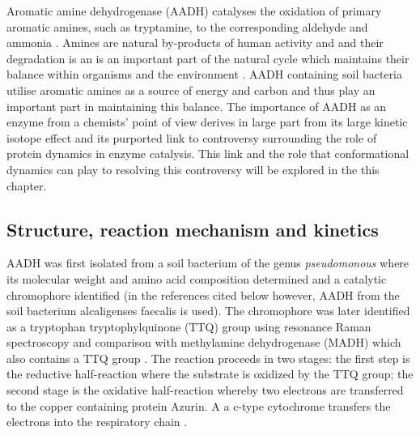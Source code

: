 Aromatic amine dehydrogenase (AADH) catalyses the oxidation of primary aromatic amines, such as tryptamine, to the corresponding aldehyde and ammonia \cite{masgrauAtomicDescriptionEnzyme2006}. Amines are natural by-products of human activity and and their degradation is an is an important part of the natural cycle which maintains their balance within organisms and the environment \cite{chistoserdovCloningSequencingMutagenesis2001}. AADH containing soil bacteria utilise aromatic amines as a source of energy and carbon \cite{govindarajAromaticAmineDehydrogenase1994a} and thus play an important part in maintaining this balance. The importance of AADH as an enzyme from a chemists' point of view derives in large part from its large kinetic isotope effect and its purported link to controversy surrounding the role of protein dynamics in enzyme catalysis. This link and the role that conformational dynamics can play to resolving this controversy will be explored in the this chapter. 


\subsection{Structure, reaction mechanism and kinetics} 


AADH was first isolated from a soil bacterium of the genus \emph{pseudomonous}  where its molecular weight and amino acid composition determined and a catalytic chromophore identified \cite{iwakiCrystallizationPropertiesAromatic1983} (in the references cited below however, AADH from the soil bacterium alcaligenses faecalis is used).  The chromophore was later identified as a tryptophan tryptophylquinone (TTQ) group using resonance Raman spectroscopy and comparison with methylamine dehydrogenase (MADH) which also contains a TTQ group \cite{govindarajAromaticAmineDehydrogenase1994a}.  The reaction proceeds in two stages: the first step is the reductive half-reaction where the substrate is oxidized by the TTQ group; the second stage is the oxidative half-reaction whereby two electrons are transferred to the copper containing protein Azurin. A a c-type cytochrome transfers the electrons into the respiratory chain \cite{masgrauAtomicDescriptionEnzyme2006}. 

